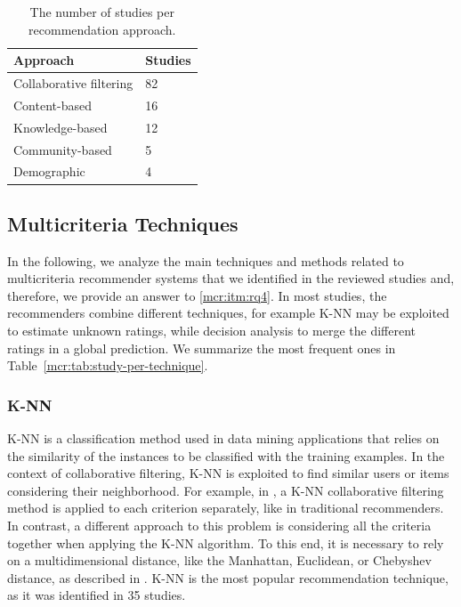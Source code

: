 \begin{table}
\centering
\begin{tabular}{@{}ll@{}}
\toprule
Approach                & Studies \\ \midrule
Collaborative filtering & 82      \\
Content-based           & 16      \\
Knowledge-based         & 12      \\
Community-based         & 5       \\
Demographic             & 4       \\ \bottomrule
\end{tabular}
\caption[Studies per recommendation approach]{The number of studies per recommendation approach.}
\label{mcr:tab:study-per-approach}
\end{table}

\subsection{Multicriteria Techniques}
\label{mcr:sec:techniques}

In the following, we analyze the main techniques and methods related to multicriteria recommender systems that we identified in the reviewed studies and, therefore, we provide an answer to \ref{mcr:itm:rq4}. In most studies, the recommenders combine different techniques, for example K-NN may be exploited to estimate unknown ratings, while decision analysis to merge the different ratings in a global prediction. We summarize the most frequent ones in Table~\ref{mcr:tab:study-per-technique}.

\subsubsection{K-NN}

K-NN is a classification method used in data mining applications that relies on the similarity of the instances to be classified with the training examples. In the context of collaborative filtering, K-NN is exploited to find similar users or items considering their neighborhood. For example, in , a K-NN collaborative filtering method is applied to each criterion separately, like in traditional recommenders. In contrast, a different approach to this problem is considering all the criteria together when applying the K-NN algorithm. To this end, it is necessary to rely on a multidimensional distance, like the Manhattan, Euclidean, or Chebyshev distance, as described in . K-NN is the most popular recommendation technique, as it was identified in 35 studies.

